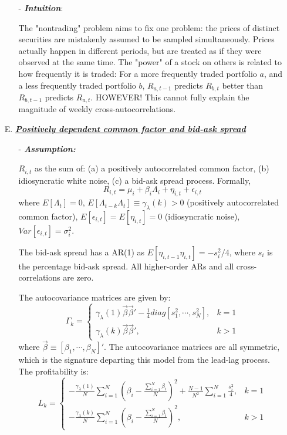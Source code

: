 \begin{enumerate}
\begin{enumerate}
        \item[-] \textbf{\textit{Intuition}}:
        
        The "nontrading" problem aims to fix one problem: the prices of distinct securities are mistakenly assumed to be sampled simultaneously. Prices actually happen
        in different periods, but are treated as if they were observed at the same time. The "power" of a stock on others is related to how frequently it is traded: For
        a more frequently traded portfolio $a$, and a less frequently traded portfolio $b$, $R_{a,t-1}$ predicts $R_{b,t}$ better than $R_{b,t-1}$ predicts $R_{a,t}$.
        HOWEVER! This cannot fully explain the magnitude of weekly cross-autocorrelations.
    
    \end{enumerate} 
    \item[E.] \underline{\textbf{\textit{Positively dependent common factor and bid-ask spread}}}
    \begin{enumerate}
        \item[-] \textbf{\textit{Assumption:}}
        
        $R_{i,t}$ as the sum of: (a) a positively autocorrelated common factor, (b) idiosyncratic white noise, (c) a bid-ask spread process. Formally, 
        $$R_{i,t}=\mu_i+\beta_i\Lambda_i+\eta_{i,t}+\epsilon_{i,t}$$
        where $E[\Lambda_t]=0$, $E[\Lambda_{t-k}\Lambda_t]\equiv\gamma_{\lambda}(k)>0$ (positively autocorrelated common factor), $E[\epsilon_{i,t}]=E[\eta_{i,t}]=0$ (idiosyncratic noise),
        $Var[\epsilon_{i,t}]=\sigma^2_i$.

        The bid-ask spread has a AR(1) as $E[\eta_{i,t-1}\eta_{i,t}]=-s_i^2/4$, where $s_i$ is the percentage bid-ask spread. All higher-order ARs and all cross-correlations are zero.

        The autocovariance matrices are given by:
        $$\Gamma_k =
        \begin{cases}
            \gamma_{\lambda}(1)\vec{\beta}\vec{\beta}' -\frac{1}{4}diag[s_1^2,\cdots,s_N^2],&k=1\\
            \gamma_{\lambda}(k)\vec{\beta}\vec{\beta}',&k>1
        \end{cases}
        $$
        where $\vec{\beta}\equiv[\beta_1,\cdots,\beta_N]'$. The autocovariance matrices are all symmetric, which is the signature departing this model from the lead-lag process.
        The profitability is:
        $$L_k=
        \begin{cases}
            -\frac{\gamma_{\lambda}(1)}{N}\sum^N_{i=1}(\beta_i-\frac{\sum^N_{i=1}\beta_i}{N})^2 +\frac{N-1}{N^2}\sum^N_{i=1}\frac{s_i^2}{4}, & k=1\\
            -\frac{\gamma_{\lambda}(k)}{N}\sum^N_{i=1}(\beta_i-\frac{\sum^N_{i=1}\beta_i}{N})^2, &k>1
        \end{cases}
        $$


\end{enumerate}
\end{enumerate}
